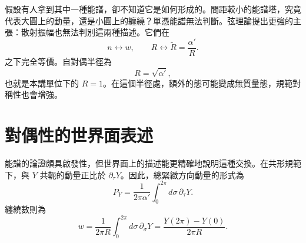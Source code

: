 假設有人拿到其中一種能譜，卻不知道它是如何形成的。間距較小的能譜塔，究竟代表大圓上的動量，還是小圓上的纏繞？單憑能譜無法判斷。弦理論提出更強的主張：散射振幅也無法判別這兩種描述。它們在
\begin{equation}
  n\longleftrightarrow w,
  \qquad
  R\longleftrightarrow \widetilde R=\frac{\alpha'}{R}.
  \label{eq:l10-radius-duality}
\end{equation}
之下完全等價。自對偶半徑為
\begin{equation}
  R=\sqrt{\alpha'},
  \label{eq:l10-self-dual-radius}
\end{equation}
也就是本講單位下的 \(R=1\)。在這個半徑處，額外的態可能變成無質量態，規範對稱性也會增強。

\begin{classroomqa}
\end{classroomqa}

\begin{classroomqa}
\end{classroomqa}

\section{對偶性的世界面表述}

能譜的論證頗具啟發性，但世界面上的描述能更精確地說明這種交換。在共形規範下，與 \(Y\) 共軛的動量正比於 \(\partial_\tau Y\)。因此，總緊緻方向動量的形式為
\begin{equation}
  P_Y=\frac{1}{2\pi\alpha'}
      \int_0^{2\pi}d\sigma\,\partial_\tau Y.
  \label{eq:l10-worldsheet-momentum}
\end{equation}
纏繞數則為
\begin{equation}
  w=\frac{1}{2\pi R}
      \int_0^{2\pi}d\sigma\,\partial_\sigma Y
   =\frac{Y(2\pi)-Y(0)}{2\pi R}.
  \label{eq:l10-worldsheet-winding}
\end{equation}

\begin{classroomqa}
\end{classroomqa}

